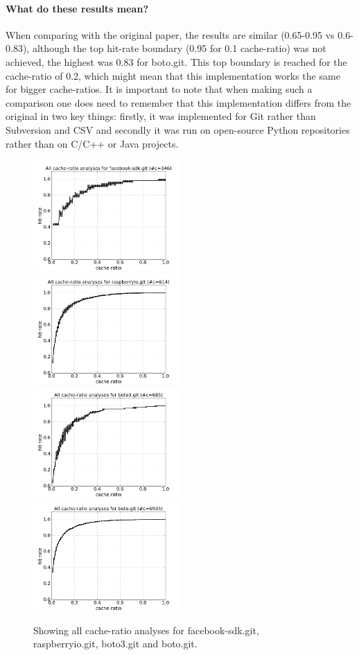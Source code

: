 \documentclass[12pt,twoside,notitlepage]{report}
\begin{document}
\paragraph{What do these results mean?} When comparing with the original paper, the results are similar (0.65-0.95 vs 0.6-0.83), although the top hit-rate boundary (0.95 for 0.1 cache-ratio) was not achieved, the highest was 0.83 for boto.git. This top boundary is reached for the cache-ratio of 0.2, which might mean that this implementation works the same for bigger cache-ratios. It is important to note that when making such a comparison one does need to remember that this implementation differs from the original in two key things: firstly, it was implemented for Git rather than Subversion and CSV and secondly it was run on open-source Python repositories rather than on C/C++ or Java projects. 
\clearpage
\begin{figure}[t]
\includegraphics[width=0.5\textwidth]{plot_all-facebook-sdk.png}
\includegraphics[width=0.5\textwidth]{plot_all-raspberryio.png}
\includegraphics[width=0.5\textwidth]{plot_all-boto3.png}
\includegraphics[width=0.5\textwidth]{plot_all-boto.png}
\caption{Showing all cache-ratio analyses for facebook-sdk.git, raspberryio.git, boto3.git and boto.git.}
\label{plot_all}
\end{figure}
\end{document}
